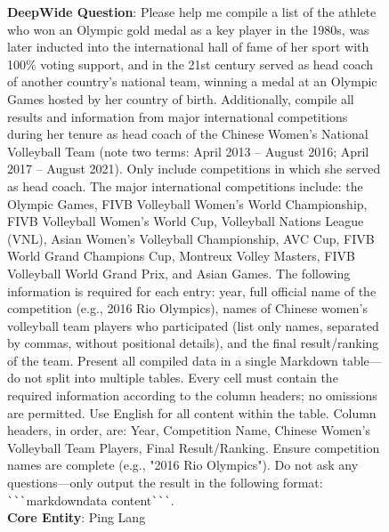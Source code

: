 \documentclass[11pt, letterpaper, logo, onecolumn, copyright, numbering]{paper_improved}
\begin{document}
\begin{figure}[htbp]
\begin{center}\end{center}\vspace{2mm}
    \begin{tcolorbox}[
        title=Input of Wide2Deep\_095 Instance,
        colback=yellow!10,
        colbacktitle=black!80,
        coltitle=white,
        arc=1mm,
        boxrule=0pt,
        breakable]
        \textbf{DeepWide Question}: Please help me compile a list of the athlete who won an Olympic gold medal as a key player in the 1980s, was later inducted into the international hall of fame of her sport with 100\% voting support, and in the 21st century served as head coach of another country's national team, winning a medal at an Olympic Games hosted by her country of birth. Additionally, compile all results and information from major international competitions during her tenure as head coach of the Chinese Women's National Volleyball Team (note two terms: April 2013 – August 2016; April 2017 – August 2021). Only include competitions in which she served as head coach. The major international competitions include: the Olympic Games, FIVB Volleyball Women's World Championship, FIVB Volleyball Women's World Cup, Volleyball Nations League (VNL), Asian Women's Volleyball Championship, AVC Cup, FIVB World Grand Champions Cup, Montreux Volley Masters, FIVB Volleyball World Grand Prix, and Asian Games. The following information is required for each entry: year, full official name of the competition (e.g., 2016 Rio Olympics), names of Chinese women's volleyball team players who participated (list only names, separated by commas, without positional details), and the final result/ranking of the team. Present all compiled data in a single Markdown table—do not split into multiple tables. Every cell must contain the required information according to the column headers; no omissions are permitted. Use English for all content within the table. Column headers, in order, are: Year, Competition Name, Chinese Women's Volleyball Team Players, Final Result/Ranking. Ensure competition names are complete (e.g., "2016 Rio Olympics"). Do not ask any questions—only output the result in the following format: \verb|```|markdown{data content}\verb|```|.\\
        \medskip
        \textbf{Core Entity}: Ping Lang
    \end{tcolorbox}
    

\end{figure}
\end{document}
